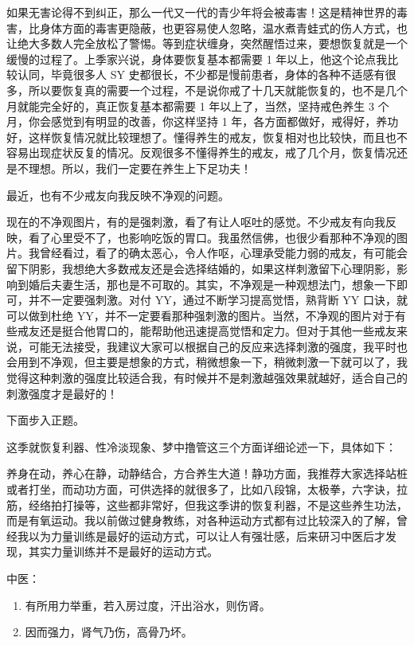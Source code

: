 \documentclass[fontset=founder]{ctexart}
\begin{document}
如果无害论得不到纠正，那么一代又一代的青少年将会被毒害！这是精神世界的毒害，比身体方面的毒害更隐蔽，也更容易使人忽略，温水煮青蛙式的伤人方式，也让绝大多数人完全放松了警惕。等到症状缠身，突然醒悟过来，要想恢复就是一个缓慢的过程了。上季家兴说，身体要恢复基本都需要 1 年以上，他这个论点我比较认同，毕竟很多人 SY 史都很长，不少都是慢前患者，身体的各种不适感有很多，所以要恢复真的需要一个过程，不是说你戒了十几天就能恢复的，也不是几个月就能完全好的，真正恢复基本都需要 1 年以上了，当然，坚持戒色养生 3 个月，你会感觉到有明显的改善，你这样坚持 1 年，各方面都做好，戒得好，养功好，这样恢复情况就比较理想了。懂得养生的戒友，恢复相对也比较快，而且也不容易出现症状反复的情况。反观很多不懂得养生的戒友，戒了几个月，恢复情况还是不理想。所以，我们一定要在养生上下足功夫！

最近，也有不少戒友向我反映不净观的问题。

现在的不净观图片，有的是强刺激，看了有让人呕吐的感觉。不少戒友有向我反映，看了心里受不了，也影响吃饭的胃口。我虽然信佛，也很少看那种不净观的图片。我曾经看过，看了的确太恶心，令人作呕，心理承受能力弱的戒友，有可能会留下阴影，我想绝大多数戒友还是会选择结婚的，如果这样刺激留下心理阴影，影响到婚后夫妻生活，那也是不可取的。其实，不净观是一种观想法门，想象一下即可，并不一定要强刺激。对付 YY，通过不断学习提高觉悟，熟背断 YY 口诀，就可以做到杜绝 YY，并不一定要看那种强刺激的图片。当然，不净观的图片对于有些戒友还是挺合他胃口的，能帮助他迅速提高觉悟和定力。但对于其他一些戒友来说，可能无法接受，我建议大家可以根据自己的反应来选择刺激的强度，我平时也会用到不净观，但主要是想象的方式，稍微想象一下，稍微刺激一下就可以了，我觉得这种刺激的强度比较适合我，有时候并不是刺激越强效果就越好，适合自己的刺激强度才是最好的！

下面步入正题。

这季就恢复利器、性冷淡现象、梦中撸管这三个方面详细论述一下，具体如下：

养身在动，养心在静，动静结合，方合养生大道！静功方面，我推荐大家选择站桩或者打坐，而动功方面，可供选择的就很多了，比如八段锦，太极拳，六字诀，拉筋，经络拍打操等，这些都非常好，但我这季讲的恢复利器，不是这些养生功法，而是有氧运动。我以前做过健身教练，对各种运动方式都有过比较深入的了解，曾经我以为力量训练是最好的运动方式，可以让人有强壮感，后来研习中医后才发现，其实力量训练并不是最好的运动方式。

中医：

\begin{enumerate}
    \item 有所用力举重，若入房过度，汗出浴水，则伤肾。
    \item 因而强力，肾气乃伤，高骨乃坏。
\end{enumerate}
\end{document}
